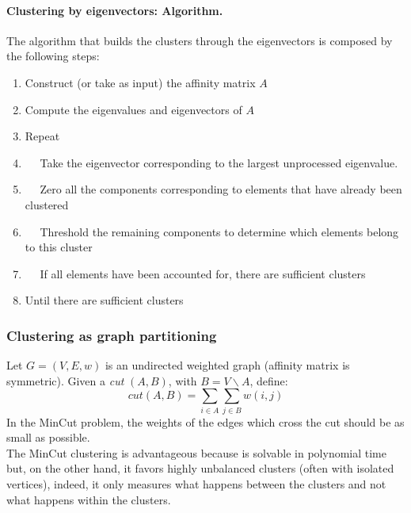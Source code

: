 \paragraph*{Clustering by eigenvectors: Algorithm.} The algorithm that builds the clusters through the eigenvectors is composed by the following steps:
\begin{enumerate}
	\item Construct (or take as input) the affinity matrix $A$
	\item Compute the eigenvalues and eigenvectors of $A$
	\item Repeat
	\item $\quad$ Take the eigenvector corresponding to the largest unprocessed eigenvalue.
	\item $\quad$ Zero all the components corresponding to elements that have already been clustered
	\item $\quad$ Threshold the remaining components to determine which elements belong to this cluster
	\item $\quad$ If all elements have been accounted for, there are sufficient clusters 
	\item Until there are sufficient clusters
\end{enumerate}

\subsubsection{Clustering as graph partitioning}
Let $G=(V,E,w)$ is an undirected weighted graph (affinity matrix is symmetric). Given a \textit{cut} $(A,B)$, with $B=V \backslash A$, define:
$$cut(A,B) = \sum_{i \in A} \sum_{j \in B} w(i,j)$$
In the MinCut problem, the weights of the edges which cross the cut should be as small as possible.\\
The MinCut clustering is advantageous because is solvable in polynomial time but, on the other hand, it favors highly unbalanced clusters (often with isolated vertices), indeed, it only measures what happens between the clusters and not what happens within the clusters.

